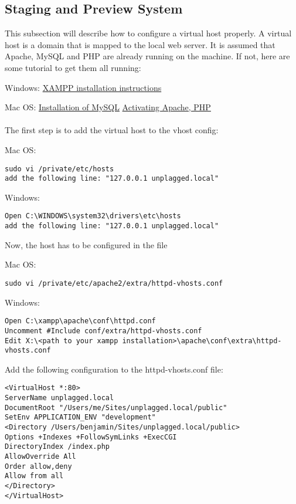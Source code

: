 \subsection{Staging and Preview System}

This subsection will describe how to configure a virtual host properly. A virtual host is a domain that is mapped to the local web server. It is assumed that Apache, MySQL and PHP are already running on the machine. If not, here are some tutorial to get them all running:

Windows: \href{http://www.apachefriends.org/de/xampp-windows.html#1098}{XAMPP installation instructions}

Mac OS: \href{http://www.djangoapp.com/blog/2011/07/24/installation-of-mysql-server-on-mac-os-x-lion/}{Installation of MySQL} \href{http://www.quarkstar.at/index.php/2009/05/18/webserver-aktivieren-und-konfigurieren-in-mac-os-x/}{Activating Apache, PHP}
\\\\The first step is to add the virtual host to the vhost config: 

Mac OS: 
\begin{verbatim}
sudo vi /private/etc/hosts
add the following line: "127.0.0.1 unplagged.local"
\end{verbatim}
Windows:
\begin{verbatim}
Open C:\WINDOWS\system32\drivers\etc\hosts
add the following line: "127.0.0.1 unplagged.local"
\end{verbatim}
Now, the host has to be configured in the file

Mac OS:
\begin{verbatim}
sudo vi /private/etc/apache2/extra/httpd-vhosts.conf
\end{verbatim}
Windows:
\begin{verbatim}
Open C:\xampp\apache\conf\httpd.conf
Uncomment #Include conf/extra/httpd-vhosts.conf
Edit X:\<path to your xampp installation>\apache\conf\extra\httpd-vhosts.conf
\end{verbatim}

Add the following configuration to the httpd-vhosts.conf file:
\begin{verbatim}
<VirtualHost *:80>
ServerName unplagged.local
DocumentRoot "/Users/me/Sites/unplagged.local/public" 
SetEnv APPLICATION_ENV "development" 
<Directory /Users/benjamin/Sites/unplagged.local/public>
Options +Indexes +FollowSymLinks +ExecCGI
DirectoryIndex /index.php
AllowOverride All
Order allow,deny
Allow from all
</Directory>
</VirtualHost>
\end{verbatim}

